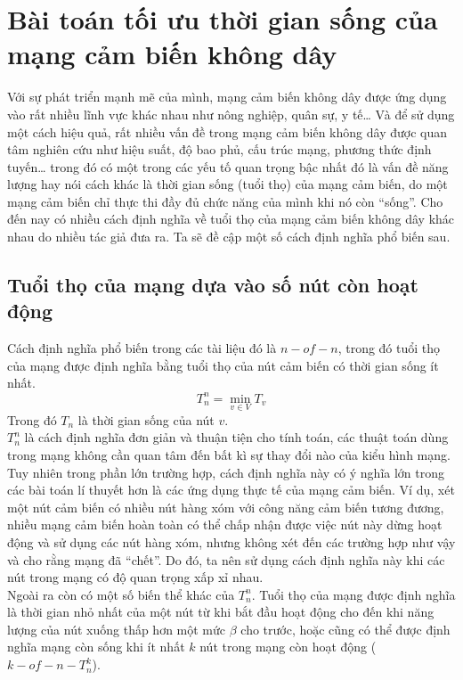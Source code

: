\section{Bài toán tối ưu thời gian sống của mạng cảm biến không dây }
Với sự phát triển mạnh mẽ của mình, mạng cảm biến không dây được ứng dụng vào rất nhiều lĩnh vực khác nhau như nông nghiệp, quân sự, y tế… Và để sử dụng một cách hiệu quả, rất nhiều vấn đề trong mạng cảm biến không dây được quan tâm nghiên cứu như hiệu suất, độ bao phủ, cấu trúc mạng, phương thức định tuyến… trong đó có một trong các yếu tố quan trọng bậc nhất đó là vấn đề năng lượng hay nói cách khác là thời gian sống (tuổi thọ) của mạng cảm biến, do một mạng cảm biến chỉ thực thi đầy đủ chức năng của mình khi nó còn “sống”. Cho đến nay có nhiều cách định nghĩa về tuổi thọ của mạng cảm biến không dây khác nhau do nhiều tác giả đưa ra. Ta sẽ đề cập một số cách định nghĩa phổ biến sau.
\subsection{Tuổi thọ của mạng dựa vào số nút còn hoạt động}
Cách định nghĩa phổ biến trong các tài liệu đó là $n-of-n$, trong đó tuổi thọ của mạng được định nghĩa bằng tuổi thọ của nút cảm biến có thời gian sống ít nhất.
\[T_n^n = \min_{v \in V} T_v\]
Trong đó $T_n$ là thời gian sống của nút $v$.
\\$T_n^n$ là cách định nghĩa đơn giản và thuận tiện cho tính toán, các thuật toán dùng trong mạng không cần quan tâm đến bất kì sự thay đổi nào của kiểu hình mạng. Tuy nhiên trong phần lớn trường hợp, cách định nghĩa này có ý nghĩa lớn trong các bài toán lí thuyết hơn là các ứng dụng thực tế của mạng cảm biến. Ví dụ, xét một nút cảm biến có nhiều nút hàng xóm với công năng cảm biến tương đương, nhiều mạng cảm biến hoàn toàn có thể chấp nhận được việc nút này dừng hoạt động và sử dụng các nút hàng xóm, nhưng  không xét đến các trường hợp như vậy và cho rằng mạng đã “chết”. Do đó, ta nên sử dụng cách định nghĩa này khi các nút trong mạng có độ quan trọng xấp xỉ nhau.
\\Ngoài ra còn có một số biến thể khác của $T_n^n$. Tuổi thọ của mạng được định nghĩa là thời gian nhỏ nhất của một nút từ khi bắt đầu hoạt động cho đến khi năng lượng của nút xuống thấp hơn một mức $\beta$ cho trước, hoặc cũng có thể được định nghĩa mạng còn sống khi ít nhất $k$ nút trong mạng còn hoạt động ($k-of-n - T_n^k$).
